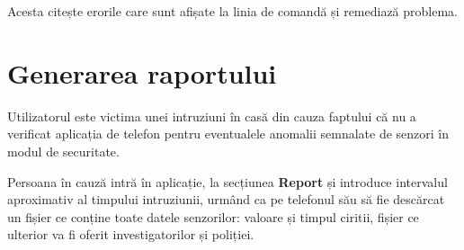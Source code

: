 Acesta citește erorile care sunt afișate la linia de comandă și remediază problema.

\section{Generarea raportului}

Utilizatorul este victima unei intruziuni în casă din cauza faptului că nu a verificat aplicația de telefon pentru eventualele anomalii semnalate de senzori în modul de securitate. 

Persoana în cauză intră în aplicație, la secțiunea \textbf{Report} și introduce intervalul aproximativ al timpului intruziunii, urmând ca pe telefonul său să fie descărcat un fișier ce conține toate datele senzorilor: valoare și timpul ciritii, fișier ce ulterior va fi oferit investigatorilor și poliției.